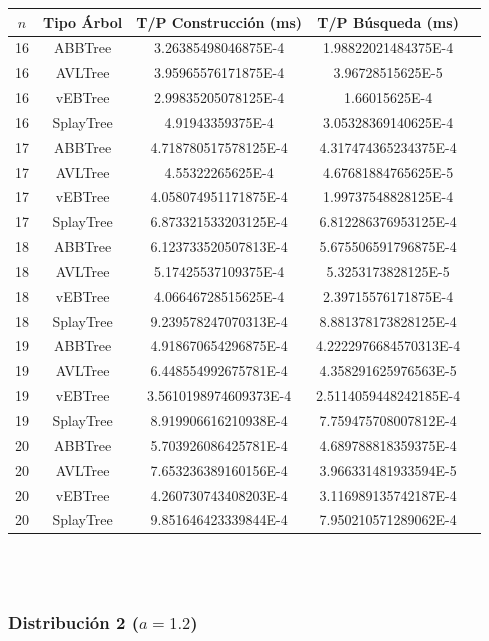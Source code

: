 \documentclass[letterpaper,12pt]{article}
\begin{document}
\begin{tabular}{|c|c|c|c|c|}
\hline
\textbf{$n$} & \textbf{Tipo Árbol} & \textbf{T/P Construcción (ms)} & \textbf{T/P Búsqueda (ms)} \\
\hline
16 & ABBTree & 3.26385498046875E-4 & 1.98822021484375E-4 \\
\hline
16 & AVLTree & 3.95965576171875E-4  & 3.96728515625E-5 \\
\hline
16 & vEBTree & 2.99835205078125E-4  & 1.66015625E-4 \\
\hline
16 & SplayTree & 4.91943359375E-4  & 3.05328369140625E-4 \\
\hline
\hline
17 & ABBTree & 4.718780517578125E-4  & 4.317474365234375E-4 \\
\hline
17 & AVLTree & 4.55322265625E-4  & 4.67681884765625E-5 \\
\hline
17 & vEBTree & 4.058074951171875E-4  & 1.99737548828125E-4\\
\hline
17 & SplayTree & 6.873321533203125E-4 & 6.812286376953125E-4 \\
\hline
\hline
18 & ABBTree & 6.123733520507813E-4 & 5.675506591796875E-4 \\
\hline
18 & AVLTree & 5.17425537109375E-4 & 5.3253173828125E-5 \\
\hline
18 & vEBTree & 4.06646728515625E-4 & 2.39715576171875E-4 \\
\hline
18 & SplayTree & 9.239578247070313E-4  & 8.881378173828125E-4 \\
\hline
\hline
19 & ABBTree & 4.918670654296875E-4 & 4.2222976684570313E-4 \\
\hline
19 & AVLTree & 6.448554992675781E-4  & 4.358291625976563E-5 \\
\hline
19 & vEBTree & 3.5610198974609373E-4 & 2.5114059448242185E-4\\
\hline
19 & SplayTree & 8.919906616210938E-4 & 7.759475708007812E-4 \\
\hline
\hline
20 & ABBTree & 5.703926086425781E-4 & 4.689788818359375E-4 \\
\hline
20 & AVLTree & 7.653236389160156E-4 & 3.966331481933594E-5 \\
\hline
20 & vEBTree & 4.260730743408203E-4 & 3.116989135742187E-4\\
\hline
20 & SplayTree & 9.851646423339844E-4 & 7.950210571289062E-4 \\
\hline
\end{tabular}
\\ \\

\subsubsection{Distribución 2 ($a=1.2$)}
\end{document}
